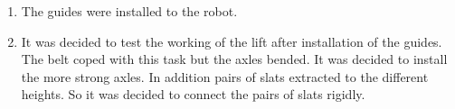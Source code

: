 \begin{enumerate}
\begin{enumerate}
      \item The guides were installed to the robot.
      
      \item It was decided to test the working of the lift after installation of the guides. The belt coped with this task but the axles bended. It was decided to install the more strong axles. In addition  pairs of slats extracted to the different heights. So it was decided to connect the pairs of slats rigidly.
      
      \begin{figure}[H]
      	\begin{minipage}[h]{0.47\linewidth}
      	\end{minipage}
      	\hfill
      	\begin{minipage}[h]{0.47\linewidth}

\end{minipage}
\end{figure}
\end{enumerate}
\end{enumerate}
